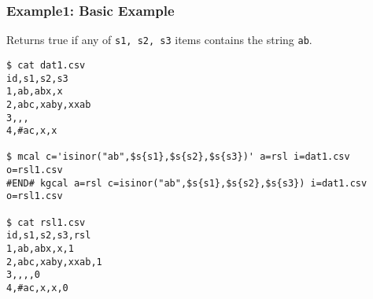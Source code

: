 
\subsubsection*{Example1: Basic Example}
Returns true if any of \verb|s1, s2, s3| items contains the string \verb|ab|.

\begin{Verbatim}[baselinestretch=0.7,frame=single]
$ cat dat1.csv
id,s1,s2,s3
1,ab,abx,x
2,abc,xaby,xxab
3,,,
4,#ac,x,x

$ mcal c='isinor("ab",$s{s1},$s{s2},$s{s3})' a=rsl i=dat1.csv o=rsl1.csv
#END# kgcal a=rsl c=isinor("ab",$s{s1},$s{s2},$s{s3}) i=dat1.csv o=rsl1.csv

$ cat rsl1.csv
id,s1,s2,s3,rsl
1,ab,abx,x,1
2,abc,xaby,xxab,1
3,,,,0
4,#ac,x,x,0
\end{Verbatim}
